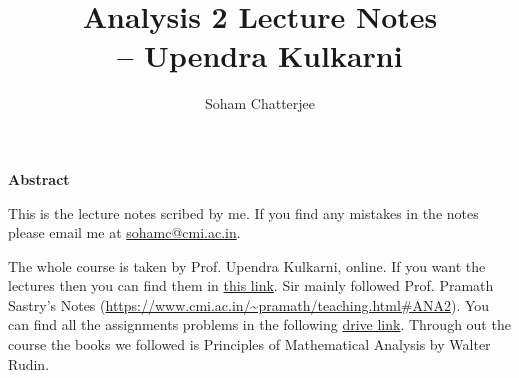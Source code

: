 \documentclass{report}
\title{\Huge{Analysis 2 Lecture Notes}\\ \hspace{4cm}-- Upendra Kulkarni}
\author{\huge{Soham Chatterjee}}
\date{}
\begin{document}
\maketitle
\newpage%
\pagebreak

\vspace*{5cm}

\begin{center}
	\textbf{Abstract}
\end{center}

This is the lecture notes scribed by me. If you find any mistakes in the notes please email me at \url{sohamc@cmi.ac.in}. 

The whole course is taken by Prof. Upendra Kulkarni, online. If you want the lectures then you can find them in \href{https://youtube.com/playlist?list=PL8I7rVYxS9smyQemVlU10yF9F37ZQN38P}{this link}. Sir mainly followed Prof. Pramath Sastry's Notes (\url{https://www.cmi.ac.in/~pramath/teaching.html#ANA2}). You can find all the assignments problems in the following  \href{https://drive.google.com/drive/folders/1dODMladIJ1f4BfMXVxoU5_YkfmWU8v4q?usp=share_link}{drive link}. Through out the course the books we followed is  Principles of Mathematical Analysis by Walter Rudin. 

\pagebreak


\end{document}
